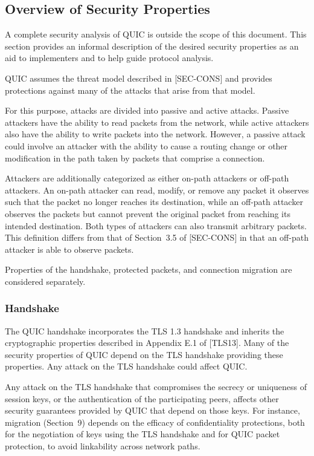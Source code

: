 \documentclass{article}
\begin{document}
\subsection{Overview of Security Properties}

A complete security analysis of QUIC is outside the scope of this document.  This section provides an informal description of the desired security properties as an aid to implementers and to help guide protocol analysis.

QUIC assumes the threat model described in [SEC-CONS] and provides protections against many of the attacks that arise from that model.

For this purpose, attacks are divided into passive and active attacks.  Passive attackers have the ability to read packets from the network, while active attackers also have the ability to write packets into the network.  However, a passive attack could involve an attacker with the ability to cause a routing change or other modification in the path taken by packets that comprise a connection.

Attackers are additionally categorized as either on-path attackers or off-path attackers.  An on-path attacker can read, modify, or remove any packet it observes such that the packet no longer reaches its destination, while an off-path attacker observes the packets but cannot prevent the original packet from reaching its intended destination.  Both types of attackers can also transmit arbitrary packets.  This definition differs from that of Section~3.5 of [SEC-CONS] in that an off-path attacker is able to observe packets.

Properties of the handshake, protected packets, and connection migration are considered separately.

\subsubsection{Handshake}

The QUIC handshake incorporates the TLS 1.3 handshake and inherits the cryptographic properties described in Appendix E.1 of [TLS13]. Many of the security properties of QUIC depend on the TLS handshake providing these properties.  Any attack on the TLS handshake could affect QUIC.

Any attack on the TLS handshake that compromises the secrecy or uniqueness of session keys, or the authentication of the participating peers, affects other security guarantees provided by QUIC that depend on those keys.  For instance, migration (Section~9) depends on the efficacy of confidentiality protections, both for the negotiation of keys using the TLS handshake and for QUIC packet protection, to avoid linkability across network paths.
\end{document}
